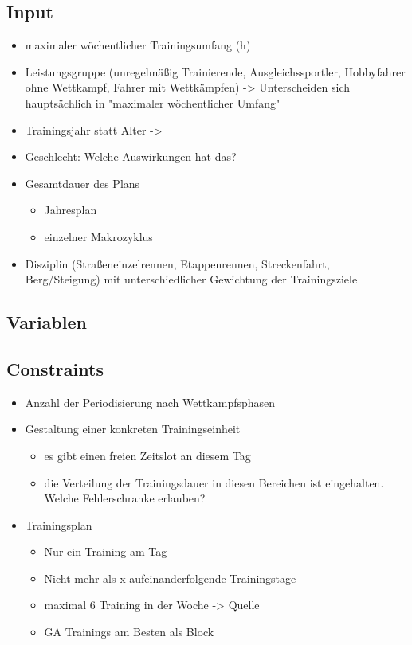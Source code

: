 \subsection{Input}
\begin{itemize}
    \item maximaler wöchentlicher Trainingsumfang (h)
    \item Leistungsgruppe \cite[S. 173]{Radsporttraining} (unregelmäßig Trainierende, Ausgleichssportler, Hobbyfahrer ohne Wettkampf, Fahrer mit Wettkämpfen) -> Unterscheiden sich hauptsächlich in "maximaler wöchentlicher Umfang"
    \item Trainingsjahr statt Alter -> \cite[181]{EinfuerungTrainingswissenschaft}
    \item Geschlecht: Welche Auswirkungen hat das?
    \item Gesamtdauer des Plans
        \begin{itemize}
            \item Jahresplan
            \item einzelner Makrozyklus
        \end{itemize}

    \item Disziplin \cite[S.11]{Radsporttraining} (Straßeneinzelrennen, Etappenrennen, Streckenfahrt, Berg/Steigung) mit unterschiedlicher Gewichtung der Trainingsziele \cite[S.14]{Radsporttraining}
\end{itemize}
\subsection{Variablen}

\subsection{Constraints}
    \begin{itemize}
        \item Anzahl der Periodisierung nach Wettkampfsphasen
        \item Gestaltung einer konkreten Trainingseinheit
        \begin{itemize}
            \item es gibt einen freien Zeitslot an diesem Tag
            \item die Verteilung der Trainingsdauer in diesen Bereichen ist eingehalten. Welche Fehlerschranke erlauben?
        \end{itemize}
        \item Trainingsplan
        \begin{itemize}
            \item Nur ein Training am Tag
            \item Nicht mehr als x aufeinanderfolgende Trainingstage
            \item maximal 6 Training in der Woche -> Quelle
            \item GA Trainings am Besten als Block \cite[34]{Radsporttraining}
        \end{itemize}
    \end{itemize}

